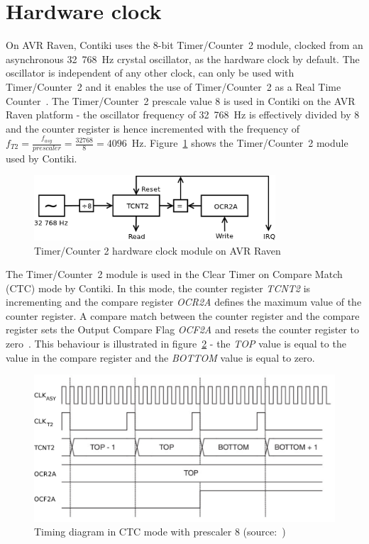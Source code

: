 
\section{Hardware clock}\label{sec:analysis-hwclock}
On AVR Raven, Contiki uses the 8-bit Timer/Counter~2 module,
clocked from an asynchronous 32~768~Hz crystal oscillator, as the hardware clock by default.
The oscillator is independent of any other clock,
can only be used with Timer/Counter~2 and it
enables the use of Timer/Counter~2 as a Real Time Counter~\cite{avr-datasheet}.
The Timer/Counter~2 prescale value 8 is used in Contiki on the AVR Raven platform -
the oscillator frequency of 32~768~Hz is effectively divided by 8 and
the counter register is hence incremented with the frequency of
$f_{T2} = {\frac{f_{asy}}{prescaler}} = {\frac{32768}{8}} = 4096$~Hz.
Figure~\ref{fig:avr-clock} shows the Timer/Counter~2 module used by Contiki.
\begin{figure}
  \centering
  \includegraphics[width=9cm,keepaspectratio]{fig/avr-clock.png}
  \caption{Timer/Counter 2 hardware clock module on AVR Raven}
  \label{fig:avr-clock}
\end{figure}

The Timer/Counter~2 module is used in the Clear Timer on Compare Match (CTC) mode by Contiki.
In this mode, the counter register {\it{TCNT2}} is incrementing
and the compare register {\it{OCR2A}} defines the maximum value of the counter register.
A compare match between the counter register and the compare register
sets the Output Compare Flag {\it{OCF2A}} and resets the counter register to zero~\cite{avr-datasheet}.
This behaviour is illustrated in figure~\ref{fig:design-timing-diagram}
- the {\it{TOP}} value is equal to the value in the compare register and the {\it{BOTTOM}} value is equal to zero.

\begin{figure}
  \centering
  \includegraphics[width=12cm,keepaspectratio]{fig/timing-diagram.pdf}
  \caption{Timing diagram in CTC mode with prescaler 8 (source:~\cite{avr-datasheet})}
  \label{fig:design-timing-diagram}
\end{figure}

